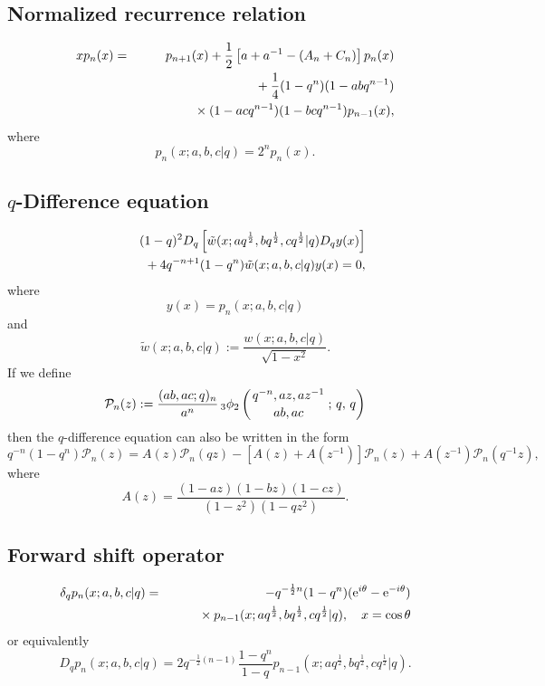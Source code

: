 \documentclass[envcountchap,graybox]{svmono}
\newcommand{\qhyp}[5]{\mbox{}_{#1}{\phi}_{#2}
\left(\genfrac{}{}{0pt}{}{#3}{#4}\,;\,q,\,#5\right)}
\newcommand{\mathindent}{\hspace{7.5mm}}
\newcommand{\e}{\textrm{e}}
\newcommand{\qhyp}[5]{\,\mbox{}_{#1}\phi_{#2}\!\left(
  \genfrac{}{}{0pt}{}{#3}{#4};#5\right)}
\begin{document}
\subsection*{Normalized recurrence relation}
\begin{eqnarray}
\label{NormRecContDualqHahn}
xp_n(x)&=&p_{n+1}(x)+\frac{1}{2}\left[a+a^{-1}-(A_n+C_n)\right]p_n(x)\nonumber\\
& &{}\mathindent{}+\frac{1}{4}(1-q^n)(1-abq^{n-1})\nonumber\\
& &{}\mathindent\mathindent{}\times(1-acq^{n-1})(1-bcq^{n-1})p_{n-1}(x),
\end{eqnarray}
where
$$p_n(x;a,b,c|q)=2^np_n(x).$$

\subsection*{$q$-Difference equation}
\begin{eqnarray}
\label{dvContDualqHahn1}
& &(1-q)^2D_q\left[{\tilde w}(x;aq^{\frac{1}{2}},bq^{\frac{1}{2}},
cq^{\frac{1}{2}}|q)D_qy(x)\right]\nonumber\\
& &{}\mathindent{}+4q^{-n+1}(1-q^n){\tilde w}(x;a,b,c|q)y(x)=0,
\end{eqnarray}
where
$$y(x)=p_n(x;a,b,c|q)$$
and
$${\tilde w}(x;a,b,c|q):=\frac{w(x;a,b,c|q)}{\sqrt{1-x^2}}.$$
If we define
$${\mathcal P}_n(z):=\frac{(ab,ac;q)_n}{a^n}\,\qhyp{3}{2}{q^{-n},az,az^{-1}}{ab,ac}{q}$$
then the $q$-difference equation can also be written in the form
\begin{equation}
\label{dvContDualqHahn2}
q^{-n}(1-q^n){\mathcal P}_n(z)=A(z){\mathcal P}_n(qz)-\left[A(z)+A(z^{-1})\right]{\mathcal P}_n(z)
+A(z^{-1}){\mathcal P}_n(q^{-1}z),
\end{equation}
where
$$A(z)=\frac{(1-az)(1-bz)(1-cz)}{(1-z^2)(1-qz^2)}.$$

\subsection*{Forward shift operator}
\begin{eqnarray}
\label{shift1ContDualqHahnI}
\delta_q p_n(x;a,b,c|q)&=&-q^{-\frac{1}{2}n}(1-q^n)(\e^{i\theta}-\e^{-i\theta})\nonumber\\
& &{}\mathindent{}\times p_{n-1}(x;aq^{\frac{1}{2}},bq^{\frac{1}{2}},cq^{\frac{1}{2}}|q),\quad x=\cos\theta
\end{eqnarray}
or equivalently
\begin{equation}
\label{shift1ContDualqHahnII}
D_q p_n(x;a,b,c|q)=
2q^{-\frac{1}{2}(n-1)}\frac{1-q^n}{1-q}p_{n-1}(x;aq^{\frac{1}{2}},bq^{\frac{1}{2}},cq^{\frac{1}{2}}|q).
\end{equation}
\end{document}
